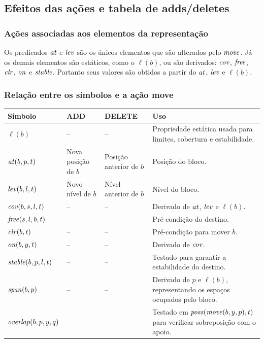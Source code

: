 \subsection{Efeitos das ações e tabela de adds/deletes}

\subsubsection{Ações associadas aos elementos da representação}
Os predicados $\mathit{at}$ e $\mathit{lev}$ são os únicos elementos que são alterados pelo $\mathit{move}$. Já os demais elementos são estáticos, como o $\ell(b)$, ou são derivados: $\mathit{cov}$, $\mathit{free}$, $\mathit{clr}$, $\mathit{on}$ e $\mathit{stable}$. Portanto seus valores são obtidos a partir do $\mathit{at}$, $\mathit{lev}$ e $\ell(b)$.

\subsubsection{Relação entre os símbolos e a ação move}
\begin{center}
\begin{tabular}{p{3.2cm} p{3cm} p{3cm} p{5cm}}
\toprule
Símbolo & ADD & DELETE & Uso \\
\midrule
$\ell(b)$ & -- & -- & Propriedade estática usada para limites, cobertura e estabilidade. \\
$\mathit{at}(b,p,t)$ & Nova posição de $b$ & Posição anterior de $b$ & Posição do bloco. \\
$\mathit{lev}(b,l,t)$ & Novo nível de $b$ & Nível anterior de $b$ & Nível do bloco. \\
$\mathit{cov}(b,s,l,t)$ & -- & -- & Derivado de $\mathit{at}$, $\mathit{lev}$ e $\ell(b)$. \\
$\mathit{free}(s,l,b,t)$ & -- & -- & Pré-condição do destino. \\
$\mathit{clr}(b,t)$ & -- & -- & Pré-condição para mover $b$. \\
$\mathit{on}(b,y,t)$ & -- & -- & Derivado de $\mathit{cov}$. \\
$\mathit{stable}(b,p,l,t)$ & -- & -- & Testado para garantir a estabilidade do destino. \\
$\mathit{span}(b,p)$ & -- & -- & Derivado de $p$ e $\ell(b)$, representando os espaços ocupados pelo bloco. \\
$\mathit{overlap}(b,p,y,q)$ & -- & -- & Testado em $\mathit{poss}(\mathit{move}(b,y,p),t)$ para verificar sobreposição com o apoio. \\
\bottomrule
\end{tabular}
\end{center}

